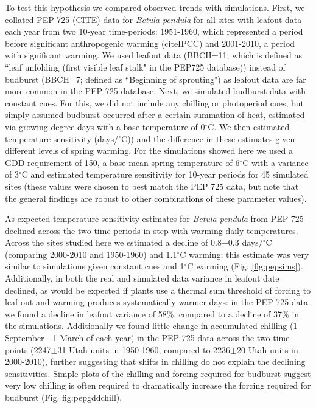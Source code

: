 \documentclass{article}
\begin{document}
\par To test this hypothesis we compared observed trends with simulations. First, we collated PEP 725 (CITE) data for \emph{Betula pendula} for all sites with leafout data each year from two 10-year time-periods: 1951-1960, which represented a period before significant anthropogenic warming (citeIPCC) and 2001-2010, a period with significant warming. We used leafout data (BBCH=11; which is defined as ``leaf unfolding (first visible leaf stalk" in the PEP725 database)) instead of budburst (BBCH=7; defined as ``Beginning of sprouting") as leafout data are far more common in the PEP 725 database. %
Next, we simulated budburst data with constant cues. For this, we did not include any chilling or photoperiod cues, but simply assumed budburst occurred after a certain summation of heat, estimated via growing degree days with a base temperature of 0$^{\circ}$C. We then estimated temperature sensitivity (days/$^{\circ}$C)) and the difference in these estimates given different levels of spring warming. For the simulations showed here we used a GDD requirement of 150, a base mean spring temperature of 6$^{\circ}$C with a variance of 3$^{\circ}$C and estimated temperature sensitivity for 10-year periods for 45 simulated sites (these values were chosen to best match the PEP 725 data, but note that the general findings are robust to other combinations of these parameter values).

\par As expected temperature sensitivity estimates for \emph{Betula pendula} from PEP 725 declined across the two time periods in step with warming daily temperatures. Across the sites studied here we estimated a decline of 0.8$\pm$0.3 days/$^{\circ}$C (comparing 2000-2010 and 1950-1960) and 1.1$^{\circ}$C warming; this estimate was very similar to simulations given constant cues and 1$^{\circ}$C warming (Fig. \ref{fig:pepsims}). Additionally, in both the real and simulated data variance in leafout date declined, as would be expected if plants use a thermal sum threshold of forcing to leaf out and warming produces systematically warmer days: in the PEP 725 data we found a decline in leafout variance of 58\%, compared to a decline of 37\% in the simulations. Additionally we found little change in accumulated chilling (1 September - 1 March of each year) in the PEP 725 data across the two time points (2247$\pm$31 Utah units in 1950-1960, compared to 2236$\pm$20 Utah units in 2000-2010), further suggesting that shifts in chilling do not explain the declining sensitivities. Simple plots of the chilling and forcing required for budburst suggest very low chilling is often required to dramatically increase the forcing required for budburst (Fig. {fig:pepgddchill}).
\end{document}
